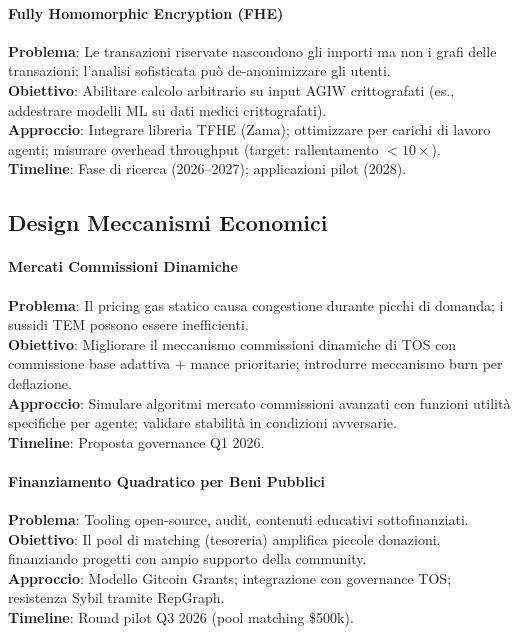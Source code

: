 \documentclass[11pt]{article}
\begin{document}
\begin{itemize}[noitemsep]
\paragraph{Fully Homomorphic Encryption (FHE)}
\textbf{Problema}: Le transazioni riservate nascondono gli importi ma non i grafi delle transazioni; l'analisi sofisticata può de-anonimizzare gli utenti.\\
\textbf{Obiettivo}: Abilitare calcolo arbitrario su input AGIW crittografati (es., addestrare modelli ML su dati medici crittografati).\\
\textbf{Approccio}: Integrare libreria TFHE (Zama); ottimizzare per carichi di lavoro agenti; misurare overhead throughput (target: rallentamento $<10\times$).\\
\textbf{Timeline}: Fase di ricerca (2026--2027); applicazioni pilot (2028).

\subsection{Design Meccanismi Economici}

\paragraph{Mercati Commissioni Dinamiche}
\textbf{Problema}: Il pricing gas statico causa congestione durante picchi di domanda; i sussidi TEM possono essere inefficienti.\\
\textbf{Obiettivo}: Migliorare il meccanismo commissioni dinamiche di TOS con commissione base adattiva + mance prioritarie; introdurre meccanismo burn per deflazione.\\
\textbf{Approccio}: Simulare algoritmi mercato commissioni avanzati con funzioni utilità specifiche per agente; validare stabilità in condizioni avversarie.\\
\textbf{Timeline}: Proposta governance Q1 2026.

\paragraph{Finanziamento Quadratico per Beni Pubblici}
\textbf{Problema}: Tooling open-source, audit, contenuti educativi sottofinanziati.\\
\textbf{Obiettivo}: Il pool di matching (tesoreria) amplifica piccole donazioni, finanziando progetti con ampio supporto della community.\\
\textbf{Approccio}: Modello Gitcoin Grants; integrazione con governance TOS; resistenza Sybil tramite RepGraph.\\
\textbf{Timeline}: Round pilot Q3 2026 (pool matching \$500k).


\end{itemize}
\end{document}
